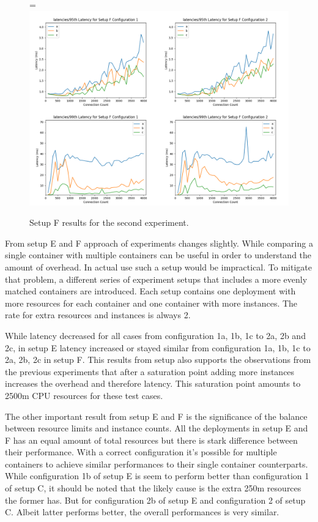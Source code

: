 \documentclass[12pt,oneandhalf,chaparabic,ceng,ms,eng,oneside,pntc]{gsufbe}
\makeatletter
\let\old@includegraphics\includegraphics
\renewcommand{\includegraphics}[2][,]{%
  \setbox9=\hbox{\old@includegraphics[#1]{#2}}%
  \ifdim\wd9>\textwidth
    \old@includegraphics[#1,width=\textwidth]{#2}%
  \else
    \old@includegraphics[#1]{#2}%
  \fi%
}
\makeatother
\begin{document}
\begin{figure}
\centering
\includegraphics[]{setupf.png}
\caption{Setup F results for the second experiment.}
\label{fig:setupf}
\end{figure}

From setup E and F approach of experiments changes slightly. While comparing a single container
with multiple containers can be useful in order to understand the amount of overhead. In actual use
such a setup would be impractical. To mitigate that problem, a different series of experiment
setups that includes a more evenly matched containers are introduced. Each setup contains one 
deployment with more resources for each container and one container with more instances. The rate for
extra resources and instances is always 2.

While latency decreased for all cases from configuration 1a, 1b, 1c to 2a, 2b and 2c, in setup E 
latency increased or stayed similar from configuration 1a, 1b, 1c to 2a, 2b, 2c in setup F. This
results from setup  also supports the observations from the previous experiments that after a
saturation point adding more instances increases the overhead and therefore latency. This saturation
point amounts to 2500m CPU resources for these test cases. 

The other important result from setup E and F is the significance of the balance between resource limits
and instance counts. All the deployments in setup E and F has an equal amount of total resources but there
is stark difference between their performance. With a correct configuration it's possible for multiple
containers to achieve similar performances to their single container counterparts. While configuration 1b
of setup E is seem to perform better than configuration 1 of setup C, it should be noted that the likely
cause is the extra 250m resources the former has. But for configuration 2b of setup E and configuration 2
of setup C. Albeit latter performs better, the overall performances is very similar.
\end{document}
